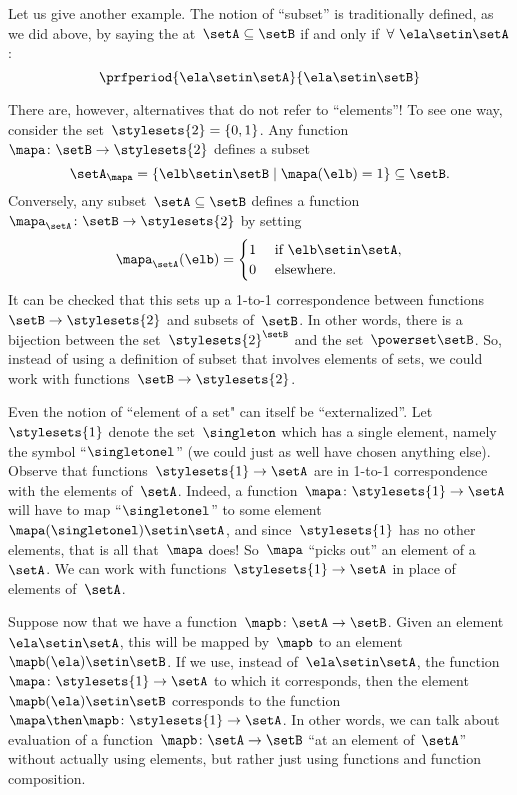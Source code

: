 Let us give another example.
The notion of ``subset'' is traditionally defined, as we did above, by saying the at~$\setA \subseteq \setB$ if and only if~$\forall \ \ela \setin\setA$:
\begin{equation*}
    \prfperiod{
        \ela \setin\setA
    }{
        \ela \setin\setB
    }
\end{equation*}

There are, however, alternatives that do not refer to ``elements''!
To see one way, consider the set~$\stylesets{2} = \{ 0, 1\}$.
Any function~$\mapa \colon \setB \to \stylesets{2}$ defines a subset
\begin{equation*}
    \setA_\mapa = \{ \elb \setin\setB \mid \mapa(\elb) = 1 \} \subseteq \setB.
\end{equation*}
Conversely, any subset~$\setA \subseteq \setB$ defines a function~$\mapa_\setA \colon \setB \to \stylesets{2}$ by setting
\begin{equation*}
    \mapa_\setA(\elb) = \begin{cases}
        1 & \text{ if }\elb\setin\setA, \\
        0 & \text{ elsewhere}.
    \end{cases}
\end{equation*}
It can be checked that this sets up a 1-to-1 correspondence between functions~$\setB \to \stylesets{2}$ and subsets of~$\setB$.
In other words, there is a bijection between the set~$\stylesets{2}^\setB$ and the set~$\powerset \setB$.
So, instead of using a definition of subset that involves elements of sets, we could work with functions~$\setB \to \stylesets{2}$.

Even the notion of ``element of a set" can itself be ``externalized''.
Let~$\stylesets{1}$ denote the set~$\singleton$ which has a single element, namely the symbol ``$\singletonel$'' (we could just as well have chosen anything else).
Observe that functions~$\stylesets{1} \to \setA$ are in 1-to-1 correspondence with the elements of~$\setA$.
Indeed, a function~$\mapa\colon \stylesets{1} \to \setA$ will have to map ``$\singletonel$'' to some element~$\mapa(\singletonel) \setin\setA$, and since~$\stylesets{1}$ has no other elements, that is all that~$\mapa$ does!
So~$\mapa$ ``picks out'' an element of a~$\setA$.
We can work with functions~$\stylesets{1} \to \setA$ in place of elements of~$\setA$.

Suppose now that we have a function~$\mapb \colon \setA \to \setB$.
Given an element~$\ela \setin\setA$, this will be mapped by~$\mapb$ to an element~$\mapb(\ela) \setin\setB$.
If we use, instead of~$\ela \setin\setA$, the function~$\mapa \colon \stylesets{1} \to \setA$ to which it corresponds, then the element~$\mapb(\ela) \setin\setB$ corresponds to the function~$\mapa \then \mapb\colon \stylesets{1} \to \setA$.
In other words, we can talk about evaluation of a function~$\mapb \colon \setA \to \setB$ ``at an element of~$\setA$'' without actually using elements, but rather just using functions and function composition.

